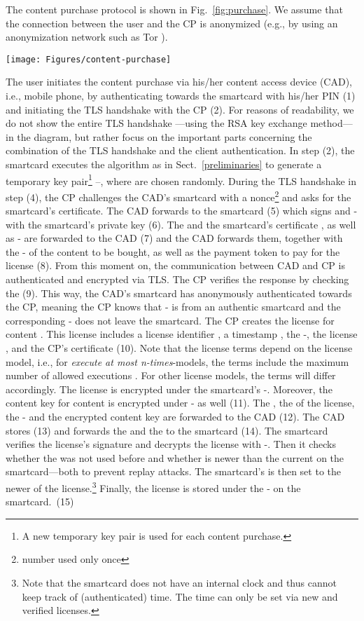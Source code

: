 \documentclass{llncs}
\newcommand{\refSec}[1]{Sect.~\ref{#1}}
\newcommand{\refFig}[1]{Fig.~\ref{#1}}
\begin{document}
The content purchase protocol is shown in \refFig{fig:purchase}. We assume that the connection between the user and the CP is anonymized (e.g., by using an anonymization network such as Tor \cite{tor}).

\begin{figure*}[ht]
	\centering
	\texttt{[image: Figures/content-purchase]}
	\caption{Content purchase protocol.}
	\label{fig:purchase}
\end{figure*} 

The user initiates the content purchase via his/her content access device (CAD), i.e., mobile phone, by authenticating towards the smartcard with his/her PIN (1) and initiating the TLS handshake with the CP (2). For reasons of readability, we do not show the entire TLS handshake \cite{tls_rfc}---using the RSA key exchange method---in the diagram, but rather focus on the important parts concerning the combination of the TLS handshake and the client authentication. In step (2), the smartcard executes the  algorithm as in \refSec{preliminaries} to generate a temporary key pair\footnote{A new temporary key pair is used for each content purchase.} --, where  are chosen randomly. During the TLS handshake in step (4), the CP challenges the CAD's smartcard with a nonce\footnote{number used only once}  and asks for the smartcard's certificate. The CAD forwards  to the smartcard (5) which signs  and - with the smartcard's private key  (6). The  and the smartcard's certificate , as well as - are forwarded to the CAD (7) and the CAD forwards them, together with the - of the content  to be bought, as well as the payment token  to pay for the license (8). From this moment on, the communication between CAD and CP is authenticated and encrypted via TLS. The CP verifies the response by checking the  (9). This way, the CAD's smartcard has anonymously authenticated towards the CP, meaning the CP knows that - is from an authentic smartcard and the corresponding - does not leave the smartcard. The CP creates the license for content . This license includes a license identifier , a timestamp , the -, the license , and the CP's certificate  (10). Note that the license terms depend on the license model, i.e., for \emph{execute at most n-times}-models, the terms include the maximum number of allowed executions . For other license models, the terms will differ accordingly. The license is encrypted under the smartcard's -. Moreover, the content key  for content  is encrypted under - as well (11). The , the  of the license, the - and the encrypted content key  are forwarded to the CAD (12). The CAD stores  (13) and forwards the  and the  to the smartcard (14). The smartcard verifies the license's signature and decrypts the license with -. Then it checks whether the  was not used before and whether  is newer than the current  on the smartcard---both to prevent replay attacks. The smartcard's  is then set to the newer  of the license.\footnote{Note that the smartcard does not have an internal clock and thus cannot keep track of (authenticated) time. The time can only be set via new and verified licenses.} Finally, the license is stored under the - on the smartcard.~(15)
\end{document}
